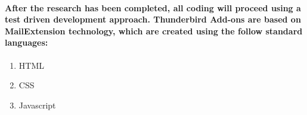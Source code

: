 \paragraph{After the research has been completed, all coding will proceed using a test driven development approach. Thunderbird Add-ons are based on MailExtension technology, which are created using the follow standard languages:}

\begin{enumerate}
\item HTML
\item CSS
\item Javascript
\end{enumerate}







